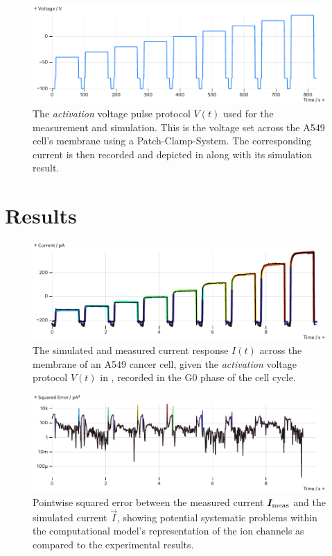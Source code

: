 \documentclass[USenglish,twocolumn]{article}
\begin{document}
  \begin{figure}
    \includegraphics[width=\columnwidth]{../figures/results/voltage-protocol.pdf}
    \caption{The \textit{activation} voltage pulse protocol $V(t)$ used for the measurement and simulation. This is the voltage set across the A549 cell's membrane using a Patch-Clamp-System. The corresponding current is then recorded and depicted in  along with its simulation result.}
    \label{figure:voltage-protocol}
  \end{figure}

  \section{Results}
  \begin{figure}[h]
    \includegraphics[width=\columnwidth]{../figures/results/full-simulation-current.pdf}
    \caption{The simulated and measured current response $I(t)$ across the membrane of an A549 cancer cell, given the \textit{activation} voltage protocol $V(t)$ in , recorded in the G0 phase of the cell cycle.}
    \label{figure:full-simulation-current}
  \end{figure}
  \begin{figure}
    \includegraphics[width=\columnwidth]{../figures/results/simulation-error.pdf}
    \caption{Pointwise squared error between the measured current $\vec{I}_{\rm meas}$ and the simulated current $\vec{I}$, showing potential systematic problems within the computational model's representation of the ion channels as compared to the experimental results.}
    \label{figure:simulation-error}
  \end{figure}
\end{document}
